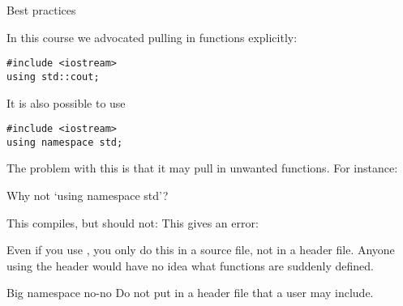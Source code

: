  {Best practices}
\label{sec:namespace-practice}

In this course we advocated
pulling in functions explicitly:
\begin{lstlisting}
#include <iostream>
using std::cout;
\end{lstlisting}

It is also possible to use
\begin{lstlisting}
#include <iostream>
using namespace std;
\end{lstlisting}

The problem with this
is that it may pull in unwanted functions. For instance:

\begin{block}{Why not `using namespace std'?}
  \label{sl:namespace-std-harm}
  \begin{multicols}{2}
    This compiles, but should not:
    \vfill\columnbreak
    This gives an error:
  \end{multicols}
\end{block}

Even if you use , you only do this in a source
file, not in a header file. Anyone using the header would have no idea what
functions are suddenly defined.

\begin{slide}{Big namespace no-no}
  \label{sl:h-no-using}
  Do not put  in a header file that a user may include.
\end{slide}
